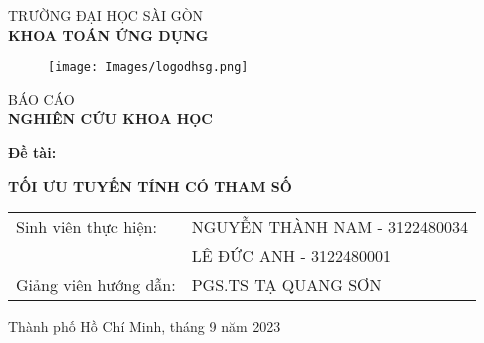 \documentclass{article} %
\begin{document}
\begin{titlepage}
\begin{center}
\vspace{-15pt} TRƯỜNG ĐẠI HỌC SÀI GÒN\\
\textbf{\fontsize{16pt}{0pt}\selectfont KHOA TOÁN ỨNG DỤNG}
\vspace{0.5cm}
\begin{figure}[H]
    \centering
    \texttt{[image: Images/logodhsg.png]}
\end{figure}
\vspace{1.5cm}
\fontsize{24pt}{0pt}\selectfont BÁO CÁO\\
\vspace{12pt}
\textbf{\fontsize{32pt}{0pt}\selectfont NGHIÊN CỨU KHOA HỌC}
\vspace{1.5cm}
\end{center}
\hspace{20pt}\textbf{\fontsize{14pt}{0pt}\selectfont Đề tài:}
\begin{center}
\textbf{\fontsize{20pt}{0pt}\selectfont TỐI ƯU TUYẾN TÍNH CÓ THAM SỐ} 
\vspace{1cm}
\begin{table}[H]
    \centering
    \begin{tabular}{l l}
\fontsize{14pt}{0pt}\selectfont Sinh viên thực hiện:     & \fontsize{14pt}{0pt}\selectfont NGUYỄN THÀNH NAM - 3122480034 \vspace{6pt}\\     
   & \fontsize{14pt}{0pt}\selectfont LÊ ĐỨC ANH - 3122480001 \vspace{6pt}\\
\fontsize{14pt}{0pt}\selectfont Giảng viên hướng dẫn: & \fontsize{14pt}{0pt}\selectfont PGS.TS TẠ QUANG SƠN
\end{tabular}
\end{table}
\vspace{1.5cm}
\fontsize{14pt}{0pt}\selectfont Thành phố Hồ Chí Minh, tháng 9 năm 2023
\end{center}
\end{titlepage}
\cleardoublepage
\thispagestyle{empty}
\end{document}
